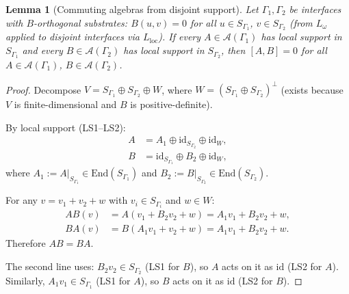 \documentclass[11pt,a4paper]{article}
\newtheorem{lemma}[theorem]{Lemma}
\theoremstyle{definition}
\begin{document}
\begin{lemma}[Commuting algebras from disjoint support]
\label{lem:loc_commut}
Let $\Gamma_1, \Gamma_2$ be interfaces with $B$-orthogonal substrates:
$B(u, v) = 0$ for all $u \in S_{\Gamma_1}$, $v \in S_{\Gamma_2}$
(from $L_\omega$ applied to disjoint interfaces via $L_{\mathrm{loc}}$).
If every $A \in \mathcal{A}(\Gamma_1)$ has local support in
$S_{\Gamma_1}$ and every $B \in \mathcal{A}(\Gamma_2)$ has local
support in $S_{\Gamma_2}$, then $[A, B] = 0$ for all
$A \in \mathcal{A}(\Gamma_1)$, $B \in \mathcal{A}(\Gamma_2)$.
\end{lemma}

\begin{proof}
Decompose $V = S_{\Gamma_1} \oplus S_{\Gamma_2} \oplus W$, where
$W = (S_{\Gamma_1} \oplus S_{\Gamma_2})^\perp$ (exists because $V$ is
finite-dimensional and $B$ is positive-definite).

By local support (LS1--LS2):
\begin{align*}
  A &= A_1 \oplus \mathrm{id}_{S_{\Gamma_2}} \oplus \mathrm{id}_W,\\
  B &= \mathrm{id}_{S_{\Gamma_1}} \oplus B_2 \oplus \mathrm{id}_W,
\end{align*}
where $A_1 := A|_{S_{\Gamma_1}} \in \mathrm{End}(S_{\Gamma_1})$
and $B_2 := B|_{S_{\Gamma_2}} \in \mathrm{End}(S_{\Gamma_2})$.

For any $v = v_1 + v_2 + w$ with $v_i \in S_{\Gamma_i}$ and $w \in W$:
\begin{align*}
  AB(v) &= A(v_1 + B_2 v_2 + w) = A_1 v_1 + B_2 v_2 + w,\\
  BA(v) &= B(A_1 v_1 + v_2 + w) = A_1 v_1 + B_2 v_2 + w.
\end{align*}
Therefore $AB = BA$.

The second line uses: $B_2 v_2 \in S_{\Gamma_2}$ (LS1 for $B$),
so $A$ acts on it as $\mathrm{id}$ (LS2 for $A$).  Similarly,
$A_1 v_1 \in S_{\Gamma_1}$ (LS1 for $A$), so $B$ acts on it as
$\mathrm{id}$ (LS2 for $B$).
\end{proof}
\end{document}
